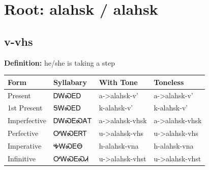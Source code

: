 \documentclass{article}%
\begin{document}
%
\normalsize%
\section*{Root: alahsk / alahsk}%
\subsection*{v-vhs}%
\textbf{Definition: }%
he/she is taking a step%
\\[0.5em]%
\begin{tabular}{|l|l|l|l|}%
\hline%
\textbf{Form}&\textbf{Syllabary}&\textbf{With Tone}&\textbf{Toneless}\\%
\hline%
Present&ᎠᎳᏍᎬᎠ&a{-}>alahsk{-}v'&a{-}>alahsk{-}v'\\%
1st Present&ᎦᎳᏍᎬᎠ&k{-}alahsk{-}v'&k{-}alahsk{-}v'\\%
Imperfective&ᎠᎳᏍᎬᏍᎪᎢ&a{-}>alahsk{-}vhsk&a{-}>alahsk{-}vhsk\\%
Perfective&ᎤᎳᏍᎬᏒᎢ&u{-}>alahsk{-}vhs&u{-}>alahsk{-}vhs\\%
Imperative&ᎭᎳᏍᎬᎾ&h{-}alahsk{-}vna&h{-}alahsk{-}vna\\%
Infinitive&ᎤᎳᏍᎬᏍᏗ&u{-}>alahsk{-}vhst&u{-}>alahsk{-}vhst\\%
\hline%
\end{tabular}%
\\[1em]%
\end{document}
